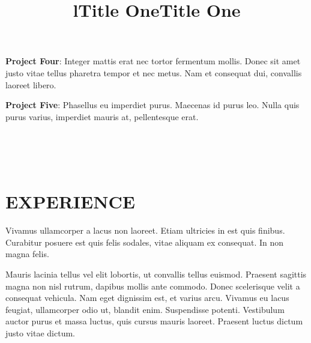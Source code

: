 \documentclass[margin]{res}
\begin{document}
\begin{resume}
\par
\textbf{Project Four}: 
Integer mattis erat nec tortor fermentum mollis. Donec sit amet justo vitae 
tellus pharetra tempor et nec metus. Nam et consequat dui, convallis laoreet 
libero. 

\par
\textbf{Project Five}: 
Phasellus eu imperdiet purus. Maecenas id purus leo. Nulla quis purus varius, 
imperdiet mauris at, pellentesque erat. 

\begin{format}
\title{l}\\
\\
\body\\
\end{format}

\section{EXPERIENCE}
\title{\textbf{Title One}}
\begin{position}
Vivamus ullamcorper a lacus non laoreet. Etiam ultricies in est quis finibus. 
Curabitur posuere est quis felis sodales, vitae aliquam ex consequat. In non 
magna felis.
\end{position}

\title{\textbf{Title One}}
\begin{position}
Mauris lacinia tellus vel elit lobortis, ut convallis tellus euismod. Praesent 
sagittis magna non nisl rutrum, dapibus mollis ante commodo. Donec scelerisque 
velit a consequat vehicula. Nam eget dignissim est, et varius arcu. Vivamus eu 
lacus feugiat, ullamcorper odio ut, blandit enim. Suspendisse potenti. 
Vestibulum auctor purus et massa luctus, quis cursus mauris laoreet. Praesent 
luctus dictum justo vitae dictum.
\end{position}
\end{resume}
\end{document}
